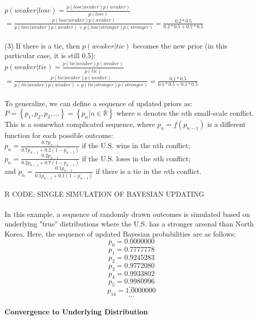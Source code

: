 \documentclass[12pt]{article}
\begin{document}
$p(weaker | lose)= \frac{p(lose | weaker) p(weaker)}{p(lose)}$\\
$= \frac{p(lose | weaker) p(weaker)}{p(lose|weaker)p(weaker)+p(lose|stronger)p(stronger)} = \frac{0.2*0.5}{0.2*0.5+0.7*0.5}$\\
\\
(3) If there is a tie, then $p(weaker | tie)$ becomes the new prior (in this particular case, it is still 0.5):\\
$p(weaker | tie)= \frac{p(tie | weaker) p(weaker)}{p(tie)}$\\
$= \frac{p(tie | weaker) p(weaker)}{p(tie|weaker)p(weaker)+p(tie|stronger)p(stronger)} = \frac{0.1*0.5}{0.1*0.5+0.1*0.5}$\\
\\
To generalize, we can define a sequence of updated priors as:\\
$P= \left\{ p_1, p_2, p_3, ... \right\} = \left\{ p_n | n \in \mathbb{R} \right\}$ where $n$ denotes the $n$th small-scale conflict.\\
This is a somewhat complicated sequence, where $p_n=f(p_{n-1})$ is a different function for each possible outcome:\\
$p_n=\frac{0.7p_{n-1}}{0.7p_{n-1}+0.2(1-p_{n-1})}$ if the U.S. wins in the $n$th conflict;\\
$p_n=\frac{0.2p_{n-1}}{0.2p_{n-1}+0.7(1-p_{n-1})}$ if the U.S. loses in the $n$th conflict;\\
and $p_n=\frac{0.1p_{n-1}}{0.1p_{n-1}+0.1(1-p_{n-1})}$ if there is a tie in the $n$th conflict.\\
\\
R CODE: SINGLE SIMULATION OF BAYESIAN UPDATING\\
\\
In this example, a sequence of randomly drawn outcomes is simulated based on underlying "true" distributions where the U.S. has a stronger arsenal than North Korea. Here, the sequence of updated Bayesian probabilities are as follows:\\
$$p_0=0.0000000$$
$$p_1=0.7777778$$
$$p_2=0.9245283$$
$$p_3=0.9772080$$
$$p_4=0.9933802$$
$$p_5=0.9980996$$
$$\dots$$
$$p_{14}=1.0000000$$
$$\dots$$

\paragraph*{Convergence to Underlying Distribution}
\end{document}
